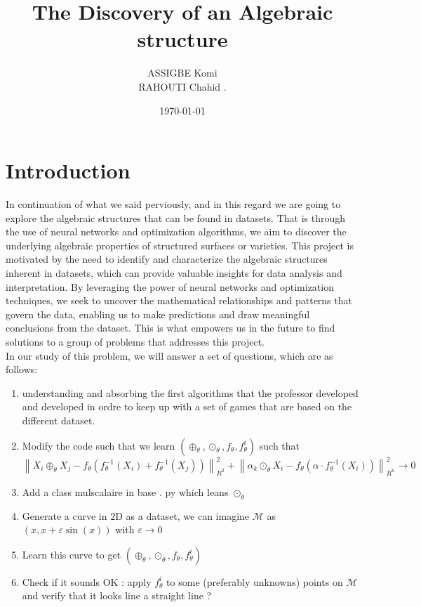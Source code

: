 \documentclass{report}
\title{The Discovery of an  Algebraic structure}
\author{ASSIGBE Komi \\ RAHOUTI Chahid .}
\date{\today}
\begin{document}
\maketitle
\newpage
\tableofcontents

\newpage

\section{Introduction}


     In continuation of what we said perviously, and in this regard we are going
        to explore the algebraic structures that can be found in datasets. That is 
        through  the use of neural networks and optimization algorithms, we aim to
        discover the underlying algebraic properties of structured surfaces or 
        varieties. This project is motivated by the need to identify and characterize
        the algebraic structures inherent in datasets, which can provide valuable
        insights for data analysis and interpretation. By leveraging the power of
        neural networks and optimization techniques, we seek to uncover the 
        mathematical relationships and patterns that govern the data, enabling us to
        make predictions and draw meaningful conclusions from the dataset. This is 
        what empowers us in the future to find solutions to a group of problems that 
        addresses this project. \\ 
        In our study of this problem, we will answer a set of questions, which are as 
        follows:
        \begin{enumerate}
            \item understanding and absorbing the first algorithms that the professor developed and developed in ordre to keep up with a set of games that are based on the different dataset. 
            \item Modify the code such that we learn $\left(\oplus_\theta, \odot_\theta, f_\theta, f_\theta^i\right)$ such that
            $$
            \left\|X_i \oplus_\theta X_j-f_\theta\left(f_\theta^{-1}\left(X_i\right)+f_\theta^{-1}\left(X_j\right)\right)\right\|_{R^2}^2+\left\|\alpha_k \odot_\theta X_i-f_\theta\left(\alpha \cdot f_\theta^{-1}\left(X_i\right)\right)\right\|_{R^n}^2 \rightarrow 0
            $$
            \item Add a class mulscalaire in base . py which leans $\odot_\theta$
            \item Generate a curve in $2 \mathrm{D}$ as a dataset, we can imagine $\mathcal{M}$ as $(x, x+\varepsilon \sin (x))$ with $\varepsilon \rightarrow 0$
            \item Learn this curve to get $\left(\oplus_\theta, \odot_\theta, f_\theta, f_\theta^i\right)$
            \item Check if it sounds OK : apply $f_\theta^i$ to some (preferably unknowns) points on $\mathcal{M}$ and verify that it looks line a straight line ?
        \end{enumerate}
\end{document}
